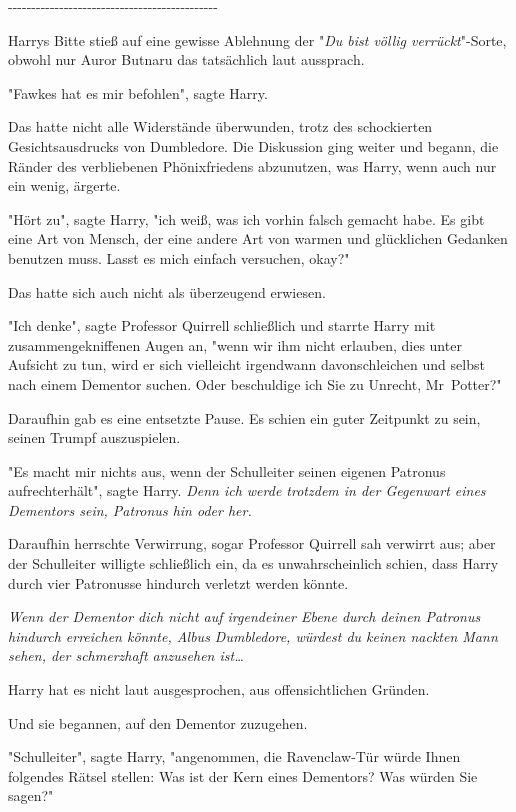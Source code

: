 {-\/-\/-\/-\/-\/-\/-\/-\/-\/-\/-\/-\/-\/-\/-\/-\/-\/-\/-\/-\/-\/-\/-\/-\/-\/-\/-\/-\/-\/-\/-\/-\/-\/-\/-\/-\/-\/-\/-\/-\/-\/-\/-\/-\/-

Harrys Bitte stieß auf eine gewisse Ablehnung der "\emph{Du bist völlig verrückt}"-Sorte, obwohl nur Auror Butnaru das tatsächlich laut aussprach.

"Fawkes hat es mir befohlen", sagte Harry.

Das hatte nicht alle Widerstände überwunden, trotz des schockierten Gesichtsausdrucks von Dumbledore. Die Diskussion ging weiter und begann, die Ränder des verbliebenen Phönixfriedens abzunutzen, was Harry, wenn auch nur ein wenig, ärgerte.

"Hört zu", sagte Harry, "ich weiß, was ich vorhin falsch gemacht habe. Es gibt eine Art von Mensch, der eine andere Art von warmen und glücklichen Gedanken benutzen muss. Lasst es mich einfach versuchen, okay?"

Das hatte sich auch nicht als überzeugend erwiesen.

"Ich denke", sagte Professor Quirrell schließlich und starrte Harry mit zusammengekniffenen Augen an, "wenn wir ihm nicht erlauben, dies unter Aufsicht zu tun, wird er sich vielleicht irgendwann davonschleichen und selbst nach einem Dementor suchen. Oder beschuldige ich Sie zu Unrecht, Mr~Potter?"

Daraufhin gab es eine entsetzte Pause. Es schien ein guter Zeitpunkt zu sein, seinen Trumpf auszuspielen.

"Es macht mir nichts aus, wenn der Schulleiter seinen eigenen Patronus aufrechterhält", sagte Harry. \emph{Denn ich werde trotzdem in der Gegenwart eines Dementors sein, Patronus hin oder her.}

Daraufhin herrschte Verwirrung, sogar Professor Quirrell sah verwirrt aus; aber der Schulleiter willigte schließlich ein, da es unwahrscheinlich schien, dass Harry durch vier Patronusse hindurch verletzt werden könnte.

\emph{Wenn der Dementor dich nicht auf irgendeiner Ebene durch deinen Patronus hindurch erreichen könnte, Albus Dumbledore, würdest du keinen nackten Mann sehen, der schmerzhaft anzusehen ist…}

Harry hat es nicht laut ausgesprochen, aus offensichtlichen Gründen.

Und sie begannen, auf den Dementor zuzugehen.

"Schulleiter", sagte Harry, "angenommen, die Ravenclaw-Tür würde Ihnen folgendes Rätsel stellen: Was ist der Kern eines Dementors? Was würden Sie sagen?"

}
